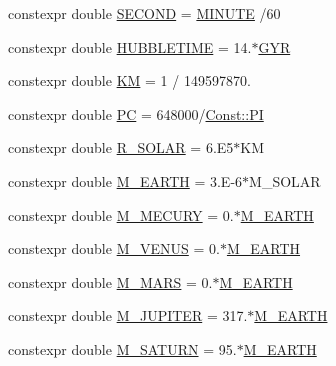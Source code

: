 \begin{DoxyCompactItemize}
\item 
constexpr double \mbox{\hyperlink{namespace_space_h_1_1_unit_a3ece158d89b3558ae66acd7e5324a101}{S\+E\+C\+O\+ND}} = \mbox{\hyperlink{namespace_space_h_1_1_unit_a581da52233fafb94663eb4e8377b4b5a}{M\+I\+N\+U\+TE}} /60
\item 
constexpr double \mbox{\hyperlink{namespace_space_h_1_1_unit_af26bad8094a2c37c5b9932d9c40baaac}{H\+U\+B\+B\+L\+E\+T\+I\+ME}} = 14.$\ast$\mbox{\hyperlink{namespace_space_h_1_1_unit_a41d9004e5902ee96826af6512c6819c4}{G\+YR}}
\item 
constexpr double \mbox{\hyperlink{namespace_space_h_1_1_unit_a57affbb952358107b4b23bfe8b2bcd6b}{KM}} = 1 / 149597870.
\item 
constexpr double \mbox{\hyperlink{namespace_space_h_1_1_unit_ac3a4adce0bc40c23ec0c3abfa48292ff}{PC}} = 648000/\mbox{\hyperlink{namespace_space_h_1_1_const_afdcc70c6f78ec4cf7baad3525ba7c618}{Const\+::\+PI}}
\item 
constexpr double \mbox{\hyperlink{namespace_space_h_1_1_unit_a0808076f6fe0cac6268f660dd72c6458}{R\+\_\+\+S\+O\+L\+AR}} = 6.\+E5$\ast$\+KM
\item 
constexpr double \mbox{\hyperlink{namespace_space_h_1_1_unit_af411a7d1df0c45c90d4f2e23fd96de94}{M\+\_\+\+E\+A\+R\+TH}} = 3.\+E-\/6$\ast$\+M\+\_\+\+S\+O\+L\+AR
\item 
constexpr double \mbox{\hyperlink{namespace_space_h_1_1_unit_a36faff1fcf3f6090c74d2e96aea6ad9c}{M\+\_\+\+M\+E\+C\+U\+RY}} = 0.$\ast$\mbox{\hyperlink{namespace_space_h_1_1_unit_af411a7d1df0c45c90d4f2e23fd96de94}{M\+\_\+\+E\+A\+R\+TH}}
\item 
constexpr double \mbox{\hyperlink{namespace_space_h_1_1_unit_a7a668de567b17096cdc91a81403f7347}{M\+\_\+\+V\+E\+N\+US}} = 0.$\ast$\mbox{\hyperlink{namespace_space_h_1_1_unit_af411a7d1df0c45c90d4f2e23fd96de94}{M\+\_\+\+E\+A\+R\+TH}}
\item 
constexpr double \mbox{\hyperlink{namespace_space_h_1_1_unit_a8d04d7cdfd1d857c8b6e633edc6998e7}{M\+\_\+\+M\+A\+RS}} = 0.$\ast$\mbox{\hyperlink{namespace_space_h_1_1_unit_af411a7d1df0c45c90d4f2e23fd96de94}{M\+\_\+\+E\+A\+R\+TH}}
\item 
constexpr double \mbox{\hyperlink{namespace_space_h_1_1_unit_a7cfce92c7e60f385723a1bfb8cfd4c75}{M\+\_\+\+J\+U\+P\+I\+T\+ER}} = 317.$\ast$\mbox{\hyperlink{namespace_space_h_1_1_unit_af411a7d1df0c45c90d4f2e23fd96de94}{M\+\_\+\+E\+A\+R\+TH}}
\item 
constexpr double \mbox{\hyperlink{namespace_space_h_1_1_unit_aea9be6aefe6f65546fc195c0e4748ca4}{M\+\_\+\+S\+A\+T\+U\+RN}} = 95.$\ast$\mbox{\hyperlink{namespace_space_h_1_1_unit_af411a7d1df0c45c90d4f2e23fd96de94}{M\+\_\+\+E\+A\+R\+TH}}

\end{DoxyCompactItemize}
